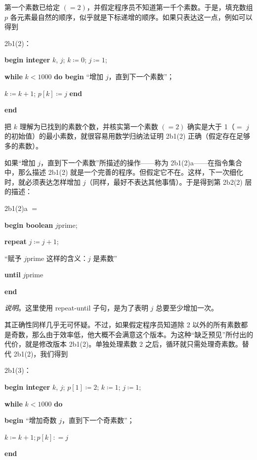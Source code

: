 第一个素数已给定 $(=2)$，并假定程序员不知道第一千个素数。于是，填充数组 $p$ 各元素最自然的顺序，似乎就是下标递增的顺序。如果只表达这一点，例如可以得到

\noindent
2b1(2)：

\noindent
\textbf{begin integer} $k$, $j$; $k \coloneq 0$; $j \coloneq 1$;

\noindent
\quad \textbf{while} $k < 1000$ \textbf{do begin} “增加 $j$，直到下一个素数”；

\noindent
\quad\quad $k \coloneq k + 1$; $p[k] \coloneq j$ \textbf{end}

\noindent
\textbf{end}

把 $k$ 理解为已找到的素数个数，并核实第一个素数 $(=2)$ 确实是大于 1（$=$ $j$ 的初始值）的最小素数，就很容易用数学归纳法证明 2b1(2) 正确（假定存在足够多的素数）。

如果“增加 $j$，直到下一个素数”所描述的操作——称为 2b1(2)a——在指令集合中，那么描述 2b1(2) 就是一个完善的程序。但假定它不在。这样，下一次细化时，就必须表达怎样增加 $j$（同样，最好不表达其他事情）。于是得到第 2b2(2) 层的描述：

\noindent
2b1(2)a $=$

\noindent
\textbf{begin boolean} $j$prime;

\noindent
\quad \textbf{repeat} $j \coloneq j + 1$;

\noindent
\quad\quad “赋予 $j$prime 这样的含义：$j$ 是素数”

\noindent
\quad \textbf{until} $j$prime

\noindent
\textbf{end}

\noindent
\textit{说明}。这里使用 repeat-until 子句，是为了表明 $j$ 总要至少增加一次。

其正确性同样几乎无可怀疑。不过，如果假定程序员知道除 2 以外的所有素数都是奇数，那么由于效率低，他大概不会满意这个版本。为这种“缺乏预见”所付出的代价，就是修改版本 2b1(2)。单独处理素数 2 之后，循环就只需处理奇素数。替代 2b1(2)，我们得到

\noindent
2b1(3)：

\noindent
\textbf{begin integer} $k$, $j$; $p[1] \coloneq 2$; $k \coloneq 1$; $j \coloneq 1$;

\noindent
\quad\textbf{while} $k < 1000$ \textbf{do}

\noindent
\quad\quad\textbf{begin} “增加奇数 $j$，直到下一个奇素数”；

\noindent
\quad\quad\quad $k \coloneq k + 1; p[k]: = j$

\noindent
\quad\quad\textbf{end}

